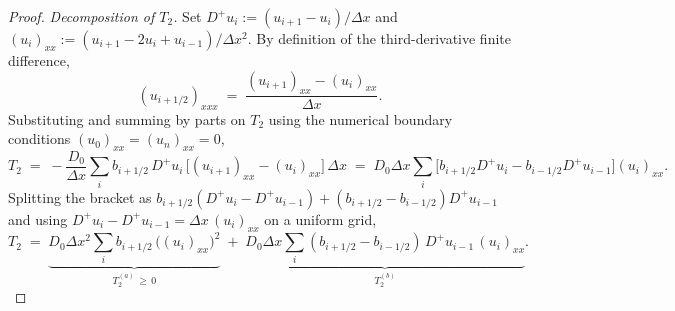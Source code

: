 \documentclass[11pt]{article}
\begin{document}
\begin{proof}
    \emph{Decomposition of $T_2$.}
    Set $D^+ u_i := (u_{i+1} - u_i)/\Delta x$ and $(u_i)_{xx} := (u_{i+1} - 2u_i + u_{i-1})/\Delta x^2$. By definition of the third-derivative finite difference,
    \begin{equation}
        (u_{i+1/2})_{xxx} \;=\; \frac{(u_{i+1})_{xx} - (u_i)_{xx}}{\Delta x}.
    \end{equation}
    Substituting and summing by parts on $T_2$ using the numerical boundary conditions $(u_0)_{xx} = (u_n)_{xx} = 0$,
    \begin{equation}
        T_2 \;=\; -\frac{D_0}{\Delta x} \sum_i b_{i+1/2}\, D^+ u_i\, \big[(u_{i+1})_{xx} - (u_i)_{xx}\big]\,\Delta x \;=\; D_0 \Delta x \sum_i \big[b_{i+1/2} D^+ u_i - b_{i-1/2} D^+ u_{i-1}\big](u_i)_{xx}.
    \end{equation}
    Splitting the bracket as $b_{i+1/2}(D^+ u_i - D^+ u_{i-1}) + (b_{i+1/2} - b_{i-1/2}) D^+ u_{i-1}$ and using $D^+ u_i - D^+ u_{i-1} = \Delta x\, (u_i)_{xx}$ on a uniform grid,
    \begin{equation}
        T_2 \;=\; \underbrace{D_0 \Delta x^2 \sum_i b_{i+1/2}\, \big((u_i)_{xx}\big)^2}_{T_2^{(a)} \,\geq\, 0} \;+\; \underbrace{D_0 \Delta x \sum_i (b_{i+1/2} - b_{i-1/2})\, D^+ u_{i-1}\, (u_i)_{xx}}_{T_2^{(b)}}. \label{eq:t2-decomp}
    \end{equation}


\end{proof}
\end{document}
